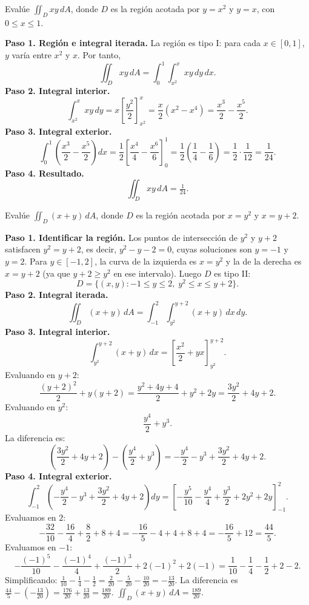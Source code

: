 \begin{example}
Evalúe $\displaystyle\iint_D xy\,dA$, donde $D$ es la región acotada por $y=x^2$ y $y=x$, con $0\le x\le 1$.
\begin{myproof}
\textbf{Paso 1. Región e integral iterada.} La región es tipo I: para cada $x\in[0,1]$, $y$ varía entre $x^2$ y $x$. Por tanto,
\[
\iint_D xy\,dA = \int_0^1\int_{x^2}^{x} xy\,dy\,dx.
\]
\textbf{Paso 2. Integral interior.}
\[
\int_{x^2}^{x} xy\,dy = x\left[\frac{y^2}{2}\right]_{x^2}^{x}
= \frac{x}{2}(x^2-x^4) = \frac{x^3}{2}-\frac{x^5}{2}.
\]
\textbf{Paso 3. Integral exterior.}
\[
\int_0^1 \left(\frac{x^3}{2}-\frac{x^5}{2}\right)dx
= \frac{1}{2}\left[\frac{x^4}{4}-\frac{x^6}{6}\right]_0^1
= \frac{1}{2}\left(\frac{1}{4}-\frac{1}{6}\right)
= \frac{1}{2}\cdot\frac{1}{12}=\frac{1}{24}.
\]
\textbf{Paso 4. Resultado.}
\[
\boxed{\iint_D xy\,dA = \tfrac{1}{24}.}
\]
\end{myproof}
\end{example}

\begin{example}
Evalúe $\displaystyle\iint_D (x+y)\,dA$, donde $D$ es la región acotada por $x=y^2$ y $x=y+2$.
\begin{myproof}
\textbf{Paso 1. Identificar la región.} Los puntos de intersección de $y^2$ y $y+2$ satisfacen $y^2=y+2$, es decir, $y^2-y-2=0$, cuyas soluciones son $y=-1$ y $y=2$. Para $y\in[-1,2]$, la curva de la izquierda es $x=y^2$ y la de la derecha es $x=y+2$ (ya que $y+2\ge y^2$ en ese intervalo). Luego $D$ es tipo II:
\[
D=\{(x,y): -1\le y\le 2,\; y^2\le x\le y+2\}.
\]
\textbf{Paso 2. Integral iterada.}
\[
\iint_D (x+y)\,dA = \int_{-1}^{2}\int_{y^2}^{y+2} (x+y)\,dx\,dy.
\]
\textbf{Paso 3. Integral interior.}
\[
\int_{y^2}^{y+2} (x+y)\,dx
= \left[\frac{x^2}{2}+yx\right]_{y^2}^{y+2}.
\]
Evaluando en $y+2$:
\[
\frac{(y+2)^2}{2}+y(y+2) = \frac{y^2+4y+4}{2}+y^2+2y
= \frac{3y^2}{2}+4y+2.
\]
Evaluando en $y^2$:
\[
\frac{y^4}{2}+y^3.
\]
La diferencia es:
\[
\left(\frac{3y^2}{2}+4y+2\right) - \left(\frac{y^4}{2}+y^3\right)
= -\frac{y^4}{2} - y^3 + \frac{3y^2}{2}+4y+2.
\]
\textbf{Paso 4. Integral exterior.}
\[
\int_{-1}^{2}\left(-\frac{y^4}{2} - y^3 + \frac{3y^2}{2}+4y+2\right)dy
= \left[-\frac{y^5}{10} - \frac{y^4}{4} + \frac{y^3}{2} + 2y^2 + 2y\right]_{-1}^{2}.
\]
Evaluamos en $2$:
\[
-\frac{32}{10} - \frac{16}{4} + \frac{8}{2} + 8 + 4
= -\frac{16}{5} - 4 + 4 + 8 + 4 = -\frac{16}{5} + 12 = \frac{44}{5}.
\]
Evaluamos en $-1$:
\[
-\frac{(-1)^5}{10} - \frac{(-1)^4}{4} + \frac{(-1)^3}{2} + 2(-1)^2 + 2(-1)
= \frac{1}{10} - \frac{1}{4} - \frac{1}{2} + 2 - 2.
\]
Simplificando: $\frac{1}{10} - \frac{1}{4} - \frac{1}{2} = \frac{2}{20} - \frac{5}{20} - \frac{10}{20} = -\frac{13}{20}$.
La diferencia es $\frac{44}{5} - \left(-\frac{13}{20}\right) = \frac{176}{20}+\frac{13}{20} = \frac{189}{20}$.
$\displaystyle\boxed{\iint_D (x+y)\,dA = \tfrac{189}{20}}$.
\end{myproof}
\end{example}

